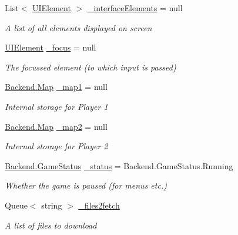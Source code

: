 \begin{DoxyCompactItemize}
List$<$ \hyperlink{class_gruppe22_1_1_client_1_1_u_i_element}{U\-I\-Element} $>$ \hyperlink{class_gruppe22_1_1_client_1_1_game_win_a65c32464243c130b3520ec347ff1659e}{\-\_\-interface\-Elements} = null
\begin{DoxyCompactList}\small\item\em A list of all elements displayed on screen \end{DoxyCompactList}\item 
\hyperlink{class_gruppe22_1_1_client_1_1_u_i_element}{U\-I\-Element} \hyperlink{class_gruppe22_1_1_client_1_1_game_win_a234b701077a7513f5a2f9d06bac40a17}{\-\_\-focus} = null
\begin{DoxyCompactList}\small\item\em The focussed element (to which input is passed) \end{DoxyCompactList}\item 
\hyperlink{class_gruppe22_1_1_backend_1_1_map}{Backend.\-Map} \hyperlink{class_gruppe22_1_1_client_1_1_game_win_a1389b978774586ee86471286cf271cc3}{\-\_\-map1} = null
\begin{DoxyCompactList}\small\item\em Internal storage for Player 1 \end{DoxyCompactList}\item 
\hyperlink{class_gruppe22_1_1_backend_1_1_map}{Backend.\-Map} \hyperlink{class_gruppe22_1_1_client_1_1_game_win_a4766437fe05165ffe55902c3eaa63025}{\-\_\-map2} = null
\begin{DoxyCompactList}\small\item\em Internal storage for Player 2 \end{DoxyCompactList}\item 
\hyperlink{namespace_gruppe22_1_1_backend_ad81bf4712f53c2ad4194343b6b0c73d2}{Backend.\-Game\-Status} \hyperlink{class_gruppe22_1_1_client_1_1_game_win_ac750d57d47285a3f2b1913b3ea784bdf}{\-\_\-status} = Backend.\-Game\-Status.\-Running
\begin{DoxyCompactList}\small\item\em Whether the game is paused (for menus etc.) \end{DoxyCompactList}\item 
Queue$<$ string $>$ \hyperlink{class_gruppe22_1_1_client_1_1_game_win_ab022cdc65543a866a781cdbc93882dd4}{\-\_\-files2fetch}
\begin{DoxyCompactList}\small\item\em A list of files to download \end{DoxyCompactList}\item 

\end{DoxyCompactItemize}
